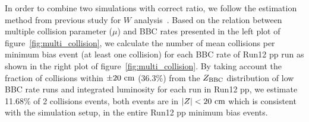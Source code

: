 \documentclass[12pt]{article}
\newcommand{\jpsi}{$J/\psi$ }
\begin{document}
In order to combine two simulations with correct ratio, we follow the estimation method from previous study for $W$ analysis~\cite{ref:an1103}. Based on the relation between multiple collision parameter ($\mu$) and BBC rates presented in the left plot of figure~\ref{fig:multi_collision}, we calculate the number of mean collisions per minimum bias event (at least one collision) for each BBC rate of Run12 pp run as shown in the right plot of figure~\ref{fig:multi_collision}. By taking account the fraction of collisions within $\pm20~{\rm cm}$ (36.3\%) from the $Z_{\rm BBC}$ distribution of low BBC rate runs and integrated luminosity for each run in Run12 pp, we estimate 11.68\% of 2 collisions events, both events are in $|Z|<20~{\rm cm}$ which is consistent with the simulation setup, in the entire Run12 pp minimum bias events.







\end{document}
